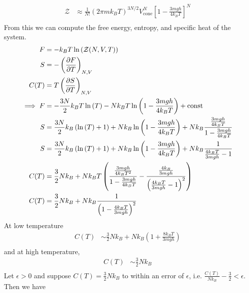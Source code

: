 \documentclass[]{book}
\begin{document}
\begin{enumerate}[1)]
\begin{enumerate}[a)]
\begin{equation}
\begin{split}
\mathcal{Z} & \approx \frac{1}{N!}\left(2\pi m k_BT\right)^{3N/2} V_{\text{cone}}^N  \left[ 1 - \frac{3mgh}{4k_BT} \right]^N \\
\end{split}
\end{equation}
From this we can compute the free energy, entropy, and specific heat of the system. 
\begin{equation}
\begin{split}
F & = -k_B T \ln \left( \mathcal{Z}(N,V,T) \right)\\
S & = - \left( \pdv{F}{T}\right)_{N,V}\\
C(T) & = T \left( \pdv{S}{T}\right)_{N,V} \\
\implies F & = -\frac{3N}{2}k_BT \ln \left(  T \right) -N k_BT \ln \left(  1 - \frac{3mgh}{4k_BT} \right) + \text{const} \\
S & = \frac{3N}{2}k_B \left( \ln \left(  T \right) + 1\right) + N k_B \ln \left(  1 - \frac{3mgh}{4k_BT} \right) + N k_B\frac{\frac{3mgh}{4k_BT}}{ 1 - \frac{3mgh}{4k_BT} }\\ 
S & = \frac{3N}{2}k_B \left( \ln \left(  T \right) + 1\right) + N k_B \ln \left(  1 - \frac{3mgh}{4k_BT} \right) + N k_B\frac{1}{  \frac{4k_BT}{3mgh}-1 }\\ 
C(T) & = \frac{3}{2}Nk_B + Nk_BT \left(  \frac{\frac{3mgh}{4k_BT^2}}{1-\frac{3mgh}{4k_BT}} - \frac{\frac{4k_B}{3mgh}}{\left(  \frac{4k_BT}{3mgh}-1\right)^2}\right) \\ 
C(T) & = \frac{3}{2}Nk_B + Nk_B \frac{1}{\left( 1- \frac{4k_BT}{3mgh }\right)^2}  \\ 
\end{split}
\end{equation}
At low temperature 
\begin{equation}
\begin{split}
C(T) & \sim \frac{3}{2}Nk_B + Nk_B\left( 1 + \frac{8k_BT}{3mgh }\right) \\
\end{split}
\end{equation}
and at high temperature, 
\begin{equation}
\begin{split}
C(T) & \sim \frac{3}{2}Nk_B  \\
\end{split}
\end{equation}
Let $\epsilon >0$ and suppose $C(T) = \frac{3}{2}Nk_B$ to within an error of $\epsilon$, i.e. $\frac{C(T)}{Nk_B} - \frac{3}{2} < \epsilon$. Then we have
\begin{equation}

\end{equation}
\end{enumerate}
\end{enumerate}
\end{document}

